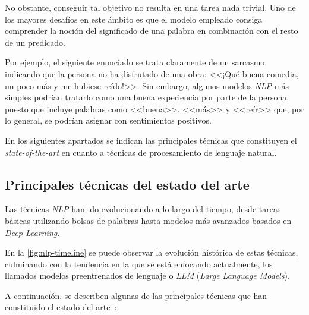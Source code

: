 No obstante, conseguir tal objetivo no resulta en una tarea nada trivial. Uno de los mayores desafíos en este ámbito es que el modelo empleado consiga comprender la noción del significado de una palabra en combinación con el resto de un predicado.

Por ejemplo, el siguiente enunciado se trata claramente de un sarcasmo, indicando que la persona no ha disfrutado de una obra: <<¡Qué buena comedia, un poco más y me hubiese reído!>>. Sin embargo, algunos modelos \textit{NLP} más simples podrían tratarlo como una buena experiencia por parte de la persona, puesto que incluye palabras como <<buena>>, <<más>> y <<reír>> que, por lo general, se podrían asignar con sentimientos positivos.

En los siguientes apartados se indican las principales técnicas que constituyen el \textit{state-of-the-art} en cuanto a técnicas de procesamiento de lenguaje natural.

\subsection{Principales técnicas del estado del arte}

Las técnicas \textit{NLP} han ido evolucionando a lo largo del tiempo, desde tareas básicas utilizando bolsas de palabras hasta modelos más avanzados basados en \textit{Deep Learning}.

En la \autoref{fig:nlp-timeline} se puede observar la evolución histórica de estas técnicas, culminando con la tendencia en la que se está enfocando actualmente, los llamados modelos preentrenados de lenguaje o \textit{LLM} (\textit{Large Language Models}).


A continuación, se describen algunas de las principales técnicas que han constituido el estado del arte~\cite{cromoNLP}:


